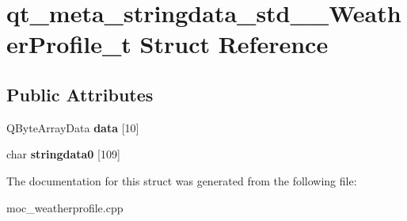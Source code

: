\hypertarget{structqt__meta__stringdata__std____WeatherProfile__t}{}\section{qt\+\_\+meta\+\_\+stringdata\+\_\+std\+\_\+\+\_\+\+Weather\+Profile\+\_\+t Struct Reference}
\label{structqt__meta__stringdata__std____WeatherProfile__t}
\subsection*{Public Attributes}
\begin{DoxyCompactItemize}
\item 
\mbox{\label{structqt__meta__stringdata__std____WeatherProfile__t_a218f64288a408ace021d0e4124615dd9}} 
Q\+Byte\+Array\+Data {\bfseries data} \mbox{[}10\mbox{]}
\item 
\mbox{\label{structqt__meta__stringdata__std____WeatherProfile__t_a3c1c18e7e3b25f88d80e65af81825574}} 
char {\bfseries stringdata0} \mbox{[}109\mbox{]}
\end{DoxyCompactItemize}


The documentation for this struct was generated from the following file\+:\begin{DoxyCompactItemize}
\item 
moc\+\_\+weatherprofile.\+cpp\end{DoxyCompactItemize}
